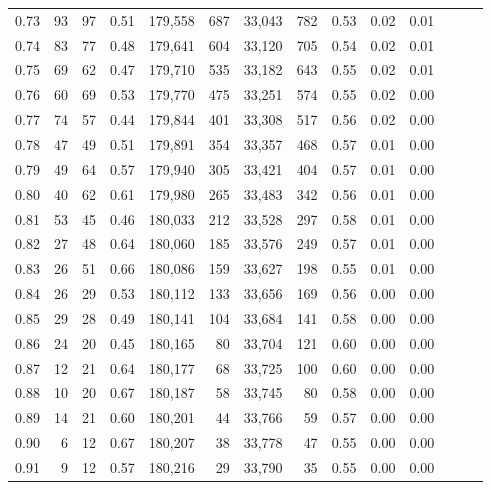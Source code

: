 \begin{tabular}{rrrrrrrrrrrrrr}
0.73 &     93 &     97 &  0.51 &  179,558 &      687 &  33,043 &     782 &  0.53 &  0.02 &      0.01 \\
0.74 &     83 &     77 &  0.48 &  179,641 &      604 &  33,120 &     705 &  0.54 &  0.02 &      0.01 \\
0.75 &     69 &     62 &  0.47 &  179,710 &      535 &  33,182 &     643 &  0.55 &  0.02 &      0.01 \\
0.76 &     60 &     69 &  0.53 &  179,770 &      475 &  33,251 &     574 &  0.55 &  0.02 &      0.00 \\
0.77 &     74 &     57 &  0.44 &  179,844 &      401 &  33,308 &     517 &  0.56 &  0.02 &      0.00 \\
0.78 &     47 &     49 &  0.51 &  179,891 &      354 &  33,357 &     468 &  0.57 &  0.01 &      0.00 \\
0.79 &     49 &     64 &  0.57 &  179,940 &      305 &  33,421 &     404 &  0.57 &  0.01 &      0.00 \\
0.80 &     40 &     62 &  0.61 &  179,980 &      265 &  33,483 &     342 &  0.56 &  0.01 &      0.00 \\
0.81 &     53 &     45 &  0.46 &  180,033 &      212 &  33,528 &     297 &  0.58 &  0.01 &      0.00 \\
0.82 &     27 &     48 &  0.64 &  180,060 &      185 &  33,576 &     249 &  0.57 &  0.01 &      0.00 \\
0.83 &     26 &     51 &  0.66 &  180,086 &      159 &  33,627 &     198 &  0.55 &  0.01 &      0.00 \\
0.84 &     26 &     29 &  0.53 &  180,112 &      133 &  33,656 &     169 &  0.56 &  0.00 &      0.00 \\
0.85 &     29 &     28 &  0.49 &  180,141 &      104 &  33,684 &     141 &  0.58 &  0.00 &      0.00 \\
0.86 &     24 &     20 &  0.45 &  180,165 &       80 &  33,704 &     121 &  0.60 &  0.00 &      0.00 \\
0.87 &     12 &     21 &  0.64 &  180,177 &       68 &  33,725 &     100 &  0.60 &  0.00 &      0.00 \\
0.88 &     10 &     20 &  0.67 &  180,187 &       58 &  33,745 &      80 &  0.58 &  0.00 &      0.00 \\
0.89 &     14 &     21 &  0.60 &  180,201 &       44 &  33,766 &      59 &  0.57 &  0.00 &      0.00 \\
0.90 &      6 &     12 &  0.67 &  180,207 &       38 &  33,778 &      47 &  0.55 &  0.00 &      0.00 \\
0.91 &      9 &     12 &  0.57 &  180,216 &       29 &  33,790 &      35 &  0.55 &  0.00 &      0.00 \\

\end{tabular}
